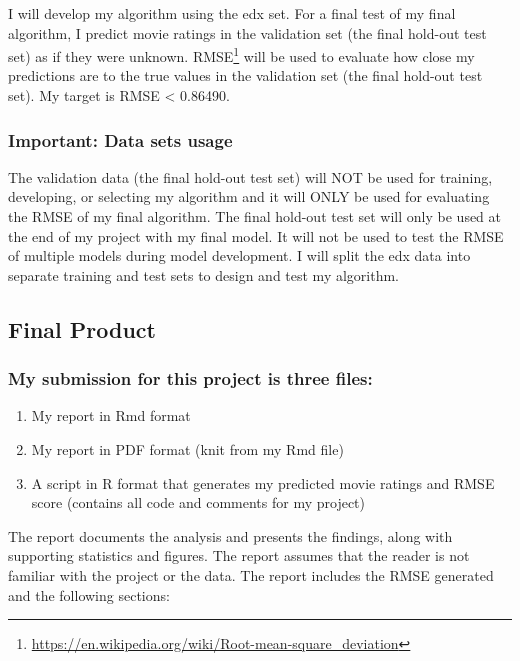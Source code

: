 \documentclass[
]{article}
\DeclareRobustCommand{\href}[2]{#2\footnote{\url{#1}}}
\providecommand{\tightlist}{%
  \setlength{\itemsep}{0pt}\setlength{\parskip}{0pt}}
\begin{document}
I will develop my algorithm using the edx set. For a final test of my
final algorithm, I predict movie ratings in the validation set (the
final hold-out test set) as if they were unknown.
\href{https://en.wikipedia.org/wiki/Root-mean-square_deviation}{RMSE}
will be used to evaluate how close my predictions are to the true values
in the validation set (the final hold-out test set). My target is RMSE
\textless{} 0.86490.

\hypertarget{important-data-sets-usage}{%
\subsubsection{Important: Data sets
usage}\label{important-data-sets-usage}}

The validation data (the final hold-out test set) will NOT be used for
training, developing, or selecting my algorithm and it will ONLY be used
for evaluating the RMSE of my final algorithm. The final hold-out test
set will only be used at the end of my project with my final model. It
will not be used to test the RMSE of multiple models during model
development. I will split the edx data into separate training and test
sets to design and test my algorithm.

\hypertarget{final-product}{%
\subsection{Final Product}\label{final-product}}

\hypertarget{my-submission-for-this-project-is-three-files}{%
\subsubsection{My submission for this project is three
files:}\label{my-submission-for-this-project-is-three-files}}

\begin{enumerate}
\def\labelenumi{\arabic{enumi}.}
\tightlist
\item
  My report in Rmd format
\item
  My report in PDF format (knit from my Rmd file)
\item
  A script in R format that generates my predicted movie ratings and
  RMSE score (contains all code and comments for my project)
\end{enumerate}

The report documents the analysis and presents the findings, along with
supporting statistics and figures. The report assumes that the reader is
not familiar with the project or the data. The report includes the RMSE
generated and the following sections:
\end{document}
